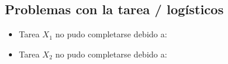 \documentclass{article}
\begin{document}
\subsection{Problemas con la tarea / logísticos}
\label{sec:orgaf6dd58}

\begin{itemize}
\item Tarea \(X_1\) no pudo completarse debido a:
\item Tarea \(X_2\) no pudo completarse debido a:
\end{itemize}

\printbibliography
\end{document}
